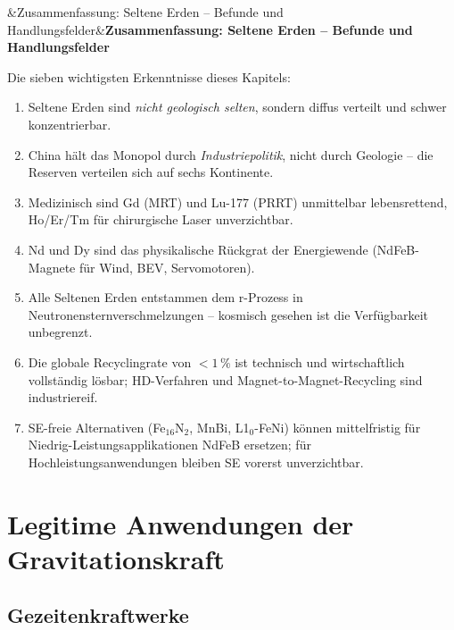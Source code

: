 ﻿\documentclass[12pt, a4paper]{report}
\newenvironment{hinweis}[1][]{%
  \begin{hinweisframe}\sloppy%
  \ifx&#1&\else\textbf{#1}\par\smallskip\fi}{\end{hinweisframe}}
\theoremstyle{definition}
\theoremstyle{remark}
\begin{document}
\begin{hinweis}[Zusammenfassung: Seltene Erden -- Befunde und Handlungsfelder]
  Die sieben wichtigsten Erkenntnisse dieses Kapitels:
  \begin{enumerate}[label=\arabic*., noitemsep]
    \item Seltene Erden sind \emph{nicht geologisch selten}, sondern diffus
          verteilt und schwer konzentrierbar.
    \item China hält das Monopol durch \emph{Industriepolitik}, nicht durch
          Geologie -- die Reserven verteilen sich auf sechs Kontinente.
    \item Medizinisch sind Gd (MRT) und Lu-177 (PRRT) unmittelbar
          lebensrettend, Ho/Er/Tm für chirurgische Laser unverzichtbar.
    \item Nd und Dy sind das physikalische Rückgrat der Energiewende
          (NdFeB-Magnete für Wind, BEV, Servomotoren).
    \item Alle Seltenen Erden entstammen dem r-Prozess in
          Neutronensternverschmelzungen -- kosmisch gesehen ist die
          Verfügbarkeit unbegrenzt.
    \item Die globale Recyclingrate von $<1\,\%$ ist technisch und
          wirtschaftlich vollständig lösbar; HD-Verfahren und
          Magnet-to-Magnet-Recycling sind industriereif.
    \item SE-freie Alternativen (Fe$_{16}$N$_2$, MnBi, L1$_0$-FeNi) können
          mittelfristig für Niedrig-Leistungsapplikationen NdFeB ersetzen;
          für Hochleistungsanwendungen bleiben SE vorerst unverzichtbar.
  \end{enumerate}
\end{hinweis}

\chapter{Legitime Anwendungen der Gravitationskraft}
\label{sec:legitim}

\section{Gezeitenkraftwerke}
\end{document}
